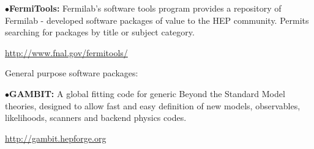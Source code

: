 \medskip

\item{$\bullet$}{\bf FermiTools:}
Fermilab's software tools program provides a repository of Fermilab - developed software packages of value to the HEP community. Permits searching for packages by title or subject category.
	\item{}\qquad\url{http://www.fnal.gov/fermitools/}

\medskip


General purpose software packages:



\item{$\bullet$}{\bf GAMBIT:}
A global fitting code for generic Beyond the Standard Model theories, designed to allow fast and easy definition of new models, observables, likelihoods, scanners and backend physics codes. 
	\item{}\qquad\url{http://gambit.hepforge.org}
      





